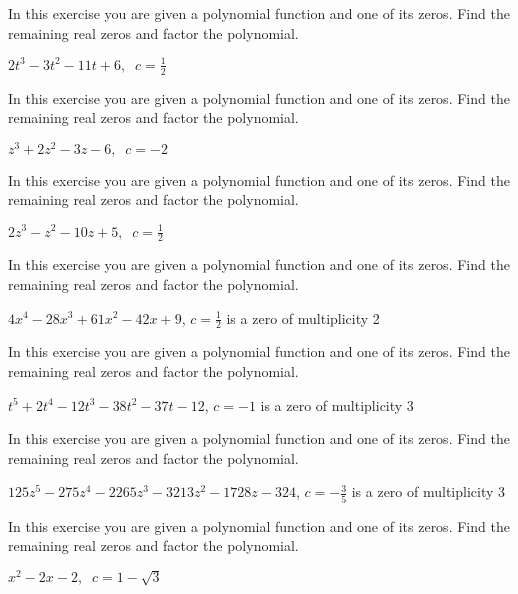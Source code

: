 \documentclass{ximera}
\begin{document}
\begin{problem}
In this exercise you are given a polynomial function and one of its zeros.  Find the remaining real zeros and factor the polynomial. 

$2t^3-3t^2-11t+6, \;\; c=\frac{1}{2}$
\end{problem}

\begin{problem}
In this exercise you are given a polynomial function and one of its zeros.  Find the remaining real zeros and factor the polynomial. 

$z^3+2z^2-3z-6, \;\; c = -2$
\end{problem}

\begin{problem}
In this exercise you are given a polynomial function and one of its zeros.  Find the remaining real zeros and factor the polynomial. 

$2z^3-z^2-10z+5, \;\; c=\frac{1}{2}$
\end{problem}

\begin{problem}
In this exercise you are given a polynomial function and one of its zeros.  Find the remaining real zeros and factor the polynomial. 

$4x^{4} - 28x^{3} + 61x^{2} - 42x + 9$, $c = \frac{1}{2}$ is a zero of multiplicity 2 
\end{problem}

\begin{problem}
In this exercise you are given a polynomial function and one of its zeros.  Find the remaining real zeros and factor the polynomial. 

$t^5+2t^4-12t^3-38t^2-37t-12$, $c=-1$ is a zero of multiplicity 3
\end{problem}

\begin{problem}
In this exercise you are given a polynomial function and one of its zeros.  Find the remaining real zeros and factor the polynomial. 

$125z^{5} - 275z^{4} - 2265z^{3} - 3213z^{2} - 1728z - 324$, $c = -\frac{3}{5}$ is a zero of multiplicity 3
\end{problem}

\begin{problem}\label{factorpolyzerolast}
In this exercise you are given a polynomial function and one of its zeros.  Find the remaining real zeros and factor the polynomial. 

$x^{2} - 2x - 2, \;\; c = 1 - \sqrt{3}$
\end{problem}
\end{document}
